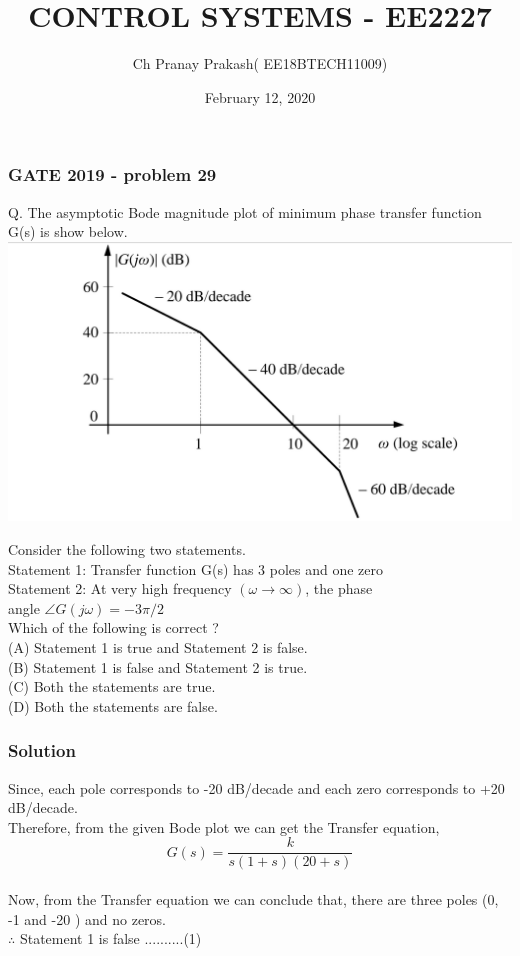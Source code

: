 \documentclass{beamer}
\title[EE2227]{CONTROL SYSTEMS - EE2227  }
\author[pranay]{ \normalsize {Ch Pranay Prakash}( EE18BTECH11009)}
\institute 
{
IIT Hyderabad

}
\date{February 12, 2020}
\begin{document}
\begin{frame}
\titlepage 
\end{frame}

\begin{frame}
\frametitle{GATE 2019 - problem 29} 
Q. The asymptotic Bode magnitude plot of  minimum phase transfer function
G(s) is show below.
\includegraphics[scale = .15]{pppp}
\end{frame}


\begin{frame}
    


Consider the following two statements.\\
\quad Statement 1: Transfer function G(s) has 3 poles and one zero \\
\quad Statement 2: At very high frequency $(\omega \to \infty)$, the phase \\  \quad \quad \quad \quad \quad \quad angle $ \angle G(j\omega)=-3\pi/2$ \\ 
Which of the following is correct ? \\
(A) Statement 1 is true and Statement 2 is false.\\
(B) Statement 1 is false and Statement 2 is true.\\
(C) Both the statements are true.\\
(D) Both the statements are false.
\end{frame}


\begin{frame}
\frametitle{Solution}

Since, each pole corresponds to -20 dB/decade  
and each zero corresponds to +20 dB/decade.\\
Therefore, from the given Bode plot we can get the Transfer equation,\\
\[ G(s) = \frac{k}{s(1+s)(20+s)} \]
\\
Now, from the Transfer equation we can conclude that,
there are three poles (0, -1 and -20 ) and no zeros.\\
\quad \quad \quad $\therefore$ Statement 1 is false \quad \quad \quad ..........(1)




\end{frame}
\end{document}
